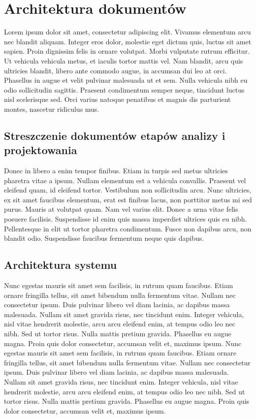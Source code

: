 \chapter{Architektura dokumentów}
Lorem ipsum dolor sit amet, consectetur adipiscing elit. Vivamus elementum arcu nec blandit aliquam. Integer eros dolor, molestie eget dictum quis, luctus sit amet sapien. Proin dignissim felis in ornare volutpat. Morbi vulputate rutrum efficitur. Ut vehicula vehicula metus, et iaculis tortor mattis vel. Nam blandit, arcu quis ultricies blandit, libero ante commodo augue, in accumsan dui leo at orci. Phasellus in augue et velit pulvinar malesuada ut et sem. Nulla vehicula nibh eu odio sollicitudin sagittis. Praesent condimentum semper neque, tincidunt luctus nisl scelerisque sed. Orci varius natoque penatibus et magnis dis parturient montes, nascetur ridiculus mus.

\section{Streszczenie dokumentów etapów analizy i projektowania}
Donec in libero a enim tempor finibus. Etiam in turpis sed metus ultricies pharetra vitae a ipsum. Nullam elementum est a vehicula convallis. Praesent vel eleifend quam, id eleifend tortor. Vestibulum non sollicitudin arcu. Nunc ultricies, ex sit amet faucibus elementum, erat est finibus lacus, non porttitor metus mi sed purus. Mauris at volutpat quam. Nam vel varius elit. Donec a urna vitae felis posuere facilisis. Suspendisse id enim quis massa imperdiet ultrices quis eu nibh. Pellentesque in elit ut tortor pharetra condimentum. Fusce non dapibus arcu, non blandit odio. Suspendisse faucibus fermentum neque quis dapibus.

\section{Architektura systemu}
Nunc egestas mauris sit amet sem facilisis, in rutrum quam faucibus. Etiam ornare fringilla tellus, sit amet bibendum nulla fermentum vitae. Nullam nec consectetur ipsum. Duis pulvinar libero vel diam lacinia, ac dapibus massa malesuada. Nullam sit amet gravida risus, nec tincidunt enim. Integer vehicula, nisl vitae hendrerit molestie, arcu arcu eleifend enim, at tempus odio leo nec nibh. Sed ut tortor risus. Nulla mattis pretium gravida. Phasellus eu augue magna. Proin quis dolor consectetur, accumsan velit et, maximus ipsum. 
Nunc egestas mauris sit amet sem facilisis, in rutrum quam faucibus. Etiam ornare fringilla tellus, sit amet bibendum nulla fermentum vitae. Nullam nec consectetur ipsum. Duis pulvinar libero vel diam lacinia, ac dapibus massa malesuada. Nullam sit amet gravida risus, nec tincidunt enim. Integer vehicula, nisl vitae hendrerit molestie, arcu arcu eleifend enim, at tempus odio leo nec nibh. Sed ut tortor risus. Nulla mattis pretium gravida. Phasellus eu augue magna. Proin quis dolor consectetur, accumsan velit et, maximus ipsum. 

